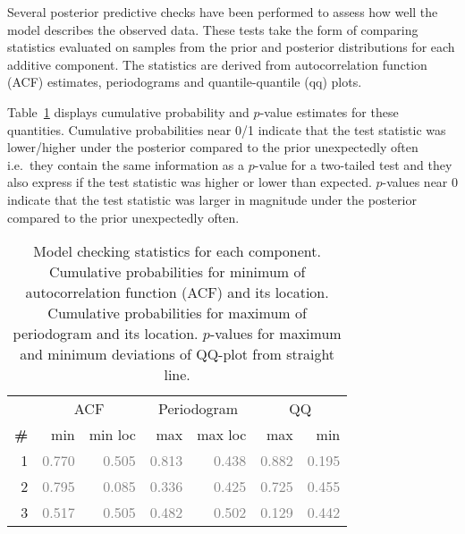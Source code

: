 \documentclass{article} %
\def\ie{i.e.\ }
\begin{document}
Several posterior predictive checks have been performed to assess how well the model describes the observed data.
These tests take the form of comparing statistics evaluated on samples from the prior and posterior distributions for each additive component.
The statistics are derived from autocorrelation function (ACF) estimates, periodograms and quantile-quantile (qq) plots.

Table~\ref{table:check} displays cumulative probability and $p$-value estimates for these quantities.
Cumulative probabilities near 0/1 indicate that the test statistic was lower/higher under the posterior compared to the prior unexpectedly often \ie they contain the same information as a $p$-value for a two-tailed test and they also express if the test statistic was higher or lower than expected.
$p$-values near 0 indicate that the test statistic was larger in magnitude under the posterior compared to the prior unexpectedly often.

\begin{table}[htb]
\begin{center}
{\small
\begin{tabular}{|r|rr|rr|rr|}
\hline
 & \multicolumn{2}{|c|}{ACF} & \multicolumn{2}{|c|}{Periodogram} & \multicolumn{2}{|c|}{QQ} \\
\bf{\#} & {min} & {min loc} & {max} & {max loc} & {max} & {min}\\
\hline

1 & \textcolor{gray}{0.770} & \textcolor{gray}{0.505} & \textcolor{gray}{0.813} & \textcolor{gray}{0.438} & \textcolor{gray}{0.882} & \textcolor{gray}{0.195}\\

2 & \textcolor{gray}{0.795} & \textcolor{gray}{0.085} & \textcolor{gray}{0.336} & \textcolor{gray}{0.425} & \textcolor{gray}{0.725} & \textcolor{gray}{0.455}\\

3 & \textcolor{gray}{0.517} & \textcolor{gray}{0.505} & \textcolor{gray}{0.482} & \textcolor{gray}{0.502} & \textcolor{gray}{0.129} & \textcolor{gray}{0.442}\\

\hline
\end{tabular}
\caption{
Model checking statistics for each component.
Cumulative probabilities for minimum of autocorrelation function (ACF) and its location.
Cumulative probabilities for maximum of periodogram and its location.
$p$-values for maximum and minimum deviations of QQ-plot from straight line.
}
\label{table:check}
}
\end{center}
\end{table}
\end{document}
